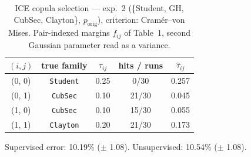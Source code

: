 \begin{table}[htbp]
  \centering
  \caption{ICE copula selection — exp.\ 2 (\{Student, GH, CubSec, Clayton\}, $p_{\text{orig}}$), criterion: Cram\'er--von Mises. Pair-indexed margins $f_{ij}$ of Table~1, second Gaussian parameter read as a variance.}
  \label{tab:exp3-exp2_orig_p__cvm}
  \begin{tabular}{ccccc}
    \toprule
    $(i, j)$ & true family & $\tau_{ij}$ & hits / runs & $\hat\tau_{ij}$ \\
    \midrule
    (0, 0) & \texttt{Student} & 0.25 & 0/30 & 0.257 \\
    (0, 1) & \texttt{CubSec} & 0.10 & 21/30 & 0.045 \\
    (1, 0) & \texttt{CubSec} & 0.10 & 15/30 & 0.055 \\
    (1, 1) & \texttt{Clayton} & 0.20 & 21/30 & 0.173 \\
    \bottomrule
  \end{tabular}
  \par\smallskip Supervised error: 10.19\% ($\pm$ 1.08). Unsupervised: 10.54\% ($\pm$ 1.08).
\end{table}
